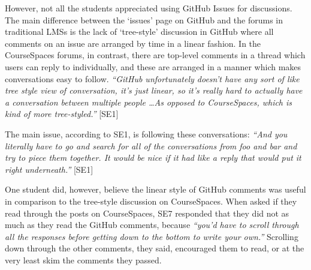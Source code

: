 However, not all the students appreciated using GitHub Issues for discussions. The main difference between the `issues' page on GitHub and the forums in traditional LMSs is the lack of `tree-style' discussion in GitHub where all comments on an issue are arranged by time in a linear fashion. In the CourseSpaces forums, in contrast, there are top-level comments in a thread which users can reply to individually, and these are arranged in a manner which makes conversations easy to follow. \textit{``GitHub unfortunately doesn't have any sort of like tree style view of conversation, it's just linear, so it's really hard to actually have a conversation between multiple people \ldots As opposed to CourseSpaces, which is kind of more tree-styled.''} [SE1]

The main issue, according to SE1, is following these conversations: \textit{``And you literally have to go and search for all of the conversations from foo and bar and try to piece them together. It would be nice if it had like a reply that would put it right underneath.''} [SE1]


One student did, however, believe the linear style of GitHub comments was useful in comparison to the tree-style discussion on CourseSpaces. When asked if they read through the posts on CourseSpaces, SE7 responded that they did not as much as they read the GitHub comments, because \textit{``you'd have to scroll through all the responses before getting down to the bottom to write your own.''} Scrolling down through the other comments, they said, encouraged them to read, or at the very least skim the comments they passed. %


